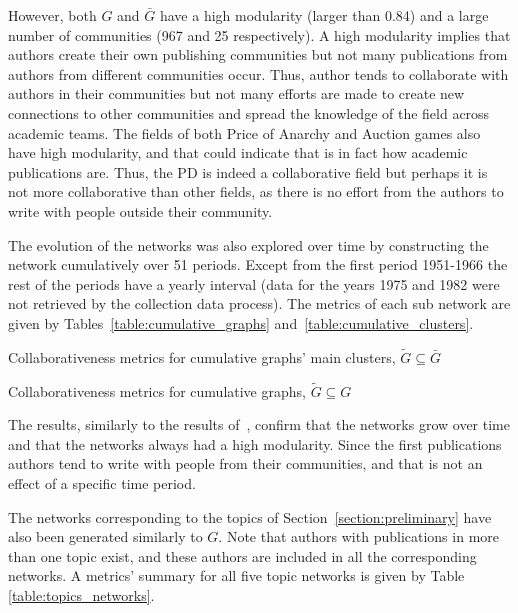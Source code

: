 However, both \(G\) and \(\bar{G}\) have a high modularity (larger than 0.84) and a large number of
communities (967 and 25 respectively). A high modularity implies that authors create their own publishing
communities but not many publications from authors from different communities
occur. Thus, author tends to collaborate with authors in their communities but
not many efforts are made to create new connections to other communities and
spread the knowledge of the field across academic teams. The fields
of both Price of Anarchy and Auction games also have high modularity, and
that could indicate that is in fact how academic publications are.
Thus, the PD is indeed a collaborative field but perhaps it is not
more collaborative than other fields, as there is no effort from the authors
to write with people outside their community.

The evolution of the networks was also explored over time by constructing the
network cumulatively over 51 periods. Except from the first period 1951-1966 the
rest of the periods have a yearly interval (data for the years 1975 and 1982
were not retrieved by the collection data process). The metrics of each sub
network are given by Tables~\ref{table:cumulative_graphs} and~\ref{table:cumulative_clusters}.

\begin{table}[!hbtp]
    \centering
    \resizebox{.9\textwidth}{!}{
    }
    \caption{Collaborativeness metrics for cumulative graphs' main clusters, \(\tilde{G} \subseteq \bar{G}\)}\label{table:cumulative_clusters}
\end{table}

\begin{table}[!hbtp]
    \centering
    \resizebox{\textwidth}{!}{
    }
    \caption{Collaborativeness metrics for cumulative graphs, \(\tilde{G} \subseteq G\)}\label{table:cumulative_graphs}
\end{table}

The results, similarly to the results of~\cite{Liu2015}, confirm that the
networks grow over time and that the networks always had a high modularity.
Since the first publications authors tend to write with people from their
communities, and that is not an effect of a specific time period.

The networks corresponding to the topics of Section~\ref{section:preliminary} have
also been generated similarly to \(G\). Note that authors with publications in
more than one topic exist, and these authors are included in all the corresponding
networks. A metrics' summary for all five topic networks is given by Table
\ref{table:topics_networks}.

